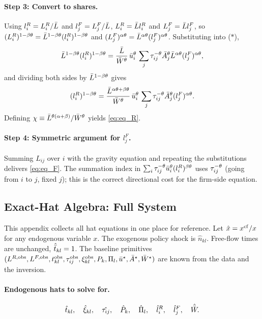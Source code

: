 \paragraph{Step 3: Convert to shares.}
Using $l_i^R=L_i^R/\bar L$ and $l_j^F=L_j^F/\bar L$,
$L_i^R=\bar L l_i^R$ and $L_j^F=\bar L l_j^F$, so
$(L_i^R)^{1-\beta\theta}=\bar L^{1-\beta\theta}(l_i^R)^{1-\beta\theta}$
and $(L_j^F)^{\alpha\theta}=\bar L^{\alpha\theta}(l_j^F)^{\alpha\theta}$.
Substituting into ($*$),
\[
  \bar L^{1-\beta\theta}(l_i^R)^{1-\beta\theta}
  =\frac{\bar L}{\bar W^{\theta}}\,\bar u_i^{\theta}\,
     \sum_j\tau_{ij}^{-\theta}\bar A_j^{\theta}\bar L^{\alpha\theta}
     (l_j^F)^{\alpha\theta},
\]
and dividing both sides by $\bar L^{1-\beta\theta}$ gives
\[
  (l_i^R)^{1-\beta\theta}
  =\frac{\bar L^{\alpha\theta+\beta\theta}}{\bar W^{\theta}}\,
     \bar u_i^{\theta}\,
     \sum_j\tau_{ij}^{-\theta}\bar A_j^{\theta}(l_j^F)^{\alpha\theta}.
\]
Defining $\chi\equiv\bar L^{\theta(\alpha+\beta)}/\bar W^{\theta}$ yields
\eqref{eq:eq_R}.

\paragraph{Step 4: Symmetric argument for $l_j^F$.}
Summing $L_{ij}$ over $i$ with the gravity equation and repeating
the substitutions delivers \eqref{eq:eq_F}.  The summation index in
$\sum_i\tau_{ij}^{-\theta}\bar u_i^{\theta}(l_i^R)^{\beta\theta}$ uses
$\tau_{ij}^{-\theta}$ (going from $i$ to $j$, fixed $j$); this is the
correct directional cost for the firm-side equation.

\subsection{Exact-Hat Algebra: Full System}\label{app:hat}

This appendix collects all hat equations in one place for reference.
Let $\hat x=x^{\mathrm{cf}}/x$ for any endogenous variable $x$.  The
exogenous policy shock is $\hat n_{kl}$.  Free-flow times are
unchanged, $\hat{\bar t}_{kl}=1$.  The baseline primitives
$(L^{R,\mathrm{obs}},L^{F,\mathrm{obs}},t_{kl}^{\mathrm{obs}},\tau_{ij}^{\mathrm{obs}},\xi_{kl}^{\mathrm{obs}},
P_k,\Pi_l,\bar u^{\star},\bar A^{\star},\bar W^{\star})$ are known from
the data and the inversion.

\paragraph{Endogenous hats to solve for.}
\[
  \hat t_{kl},\quad\hat\xi_{kl},\quad\hat{\tau_{ij}},\quad\hat P_k,
  \quad\hat\Pi_l,\quad\hat l_i^R,\quad\hat l_j^F,\quad\hat{\bar W}.
\]

